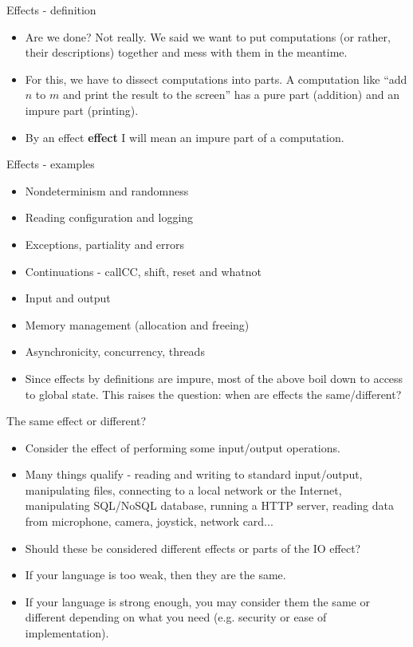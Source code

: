 \documentclass{beamer}
\begin{document}
\begin{frame}{Effects - definition}
\begin{itemize}
	\item Are we done? Not really. We said we want to put computations (or rather, their descriptions) together and mess with them in the meantime.
	\item For this, we have to dissect computations into parts. A computation like ``add $n$ to $m$ and print the result to the screen'' has a pure part (addition) and an impure part (printing).
	\item By an effect \textbf{effect} I will mean an impure part of a computation.
\end{itemize}
\end{frame}

\begin{frame}{Effects - examples}
\begin{itemize}
	\item Nondeterminism and randomness
	\item Reading configuration and logging
	\item Exceptions, partiality and errors
	\item Continuations - callCC, shift, reset and whatnot
	\item Input and output
	\item Memory management (allocation and freeing)
	\item Asynchronicity, concurrency, threads
	\item Since effects by definitions are impure, most of the above boil down to access to global state. This raises the question: when are effects the same/different?
\end{itemize}
\end{frame}

\begin{frame}{The same effect or different?}
\begin{itemize}
	\item Consider the effect of performing some input/output operations.
	\item Many things qualify - reading and writing to standard input/output, manipulating files, connecting to a local network or the Internet, manipulating SQL/NoSQL database, running a HTTP server, reading data from microphone, camera, joystick, network card...
	\item Should these be considered different effects or parts of the IO effect?
	\item If your language is too weak, then they are the same.
	\item If your language is strong enough, you may consider them the same or different depending on what you need (e.g. security or ease of implementation).
\end{itemize}
\end{frame}
\end{document}
